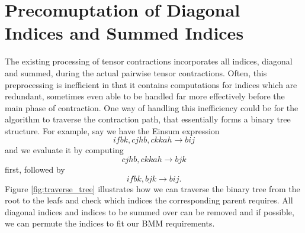 \section{Precomuptation of Diagonal Indices and Summed Indices}
The existing processing of tensor contractions incorporates all indices, diagonal and summed,
during the actual pairwise tensor contractions. Often, this preprocessing is inefficient in
that it contains computations for indices which are redundant, sometimes even able to be
handled far more effectively before the main phase of contraction. One way of handling this
inefficiency could be for the algorithm to traverse the contraction path, that essentially
forms a binary tree structure. For example, say we have the Einsum
expression
\begin{equation*}
    ifbk, cjhb, ckkah \rightarrow bij
\end{equation*}
and we evaluate it by computing
\begin{equation*}
    cjhb, ckkah \rightarrow bjk
\end{equation*}
first, followed by
\begin{equation*}
    ifbk, bjk \rightarrow bij.
\end{equation*}
Figure \ref{fig:traverse_tree} illustrates how we can traverse the binary tree from the root to the leafs and
check which indices the corresponding parent requires. All diagonal indices and indices to be
summed over can be removed and if possible, we can permute the indices to fit our BMM requirements.
\\
\\

